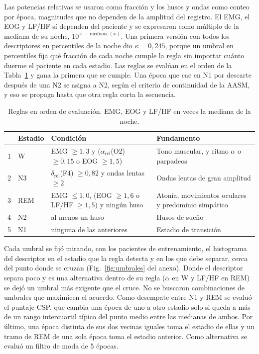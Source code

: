 Las potencias relativas se usaron como fracción y los husos y ondas como conteo por época, magnitudes que no dependen de la amplitud del registro. El EMG, el EOG y LF/HF sí dependen del paciente y se expresaron como múltiplo de la mediana de su noche, $10^{\,x-\operatorname{mediana}(x)}$. Una primera versión con todos los descriptores en percentiles de la noche dio $\kappa = 0{,}245$, porque un umbral en percentiles fija qué fracción de cada noche cumple la regla sin importar cuánto duerme el paciente en cada estadio. Las reglas se evalúan en el orden de la Tabla~\ref{tab:reglas} y gana la primera que se cumple. Una época que cae en N1 por descarte después de una N2 se asigna a N2, según el criterio de continuidad de la AASM, y eso se propaga hasta que otra regla corta la secuencia.

\begin{table}[htbp]
  \centering\small
  \caption{Reglas en orden de evaluación. EMG, EOG y LF/HF en veces la mediana de la noche.}
  \label{tab:reglas}
  \begin{tabularx}{\textwidth}{clXX}
    \toprule
    & Estadio & Condición & Fundamento \\
    \midrule
    1 & W   & EMG $\geq 1{,}3$ y ($\alpha_\text{rel}$(O2) $\geq 0{,}15$ o EOG $\geq 1{,}5$) & Tono muscular, y ritmo $\alpha$ o parpadeos \\
    2 & N3  & $\delta_\text{rel}$(F4) $\geq 0{,}82$ y ondas lentas $\geq 2$ & Ondas lentas de gran amplitud \\
    3 & REM & EMG $\leq 1{,}0$, (EOG $\geq 1{,}6$ o LF/HF $\geq 1{,}5$) y ningún huso & Atonía, movimientos oculares y predominio simpático \\
    4 & N2  & al menos un huso & Husos de sueño \\
    5 & N1  & ninguna de las anteriores & Estadio de transición \\
    \bottomrule
  \end{tabularx}
\end{table}

Cada umbral se fijó mirando, con los pacientes de entrenamiento, el histograma del descriptor en el estadio que la regla detecta y en los que debe separar, cerca del punto donde se cruzan (Fig.~\ref{fig:umbrales} del anexo). Donde el descriptor separa poco y es una alternativa dentro de su regla ($\alpha$ en W y LF/HF en REM) se dejó un umbral más exigente que el cruce. No se buscaron combinaciones de umbrales que maximicen el acuerdo. Como desempate entre N1 y REM se evaluó el puntaje CSP, que cambia una época de uno a otro estadio solo si queda a más de un rango intercuartil típico del punto medio entre las medianas de ambos. Por último, una época distinta de sus dos vecinas iguales toma el estadio de ellas y un tramo de REM de una sola época toma el estadio anterior. Como alternativa se evaluó un filtro de moda de 5 épocas.

